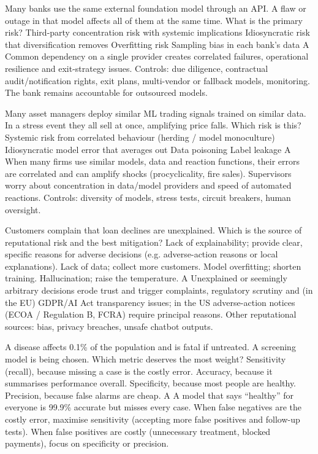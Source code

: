 {Many banks use the same external foundation model through an API. A flaw or outage in that model affects all of them at the same time. What is the primary risk?}
{Third-party concentration risk with systemic implications}
{Idiosyncratic risk that diversification removes}
{Overfitting risk}
{Sampling bias in each bank's data}
{A}
{Common dependency on a single provider creates correlated failures, operational resilience and exit-strategy issues. Controls: due diligence, contractual audit/notification rights, exit plans, multi-vendor or fallback models, monitoring. The bank remains accountable for outsourced models.}

{Many asset managers deploy similar ML trading signals trained on similar data. In a stress event they all sell at once, amplifying price falls. Which risk is this?}
{Systemic risk from correlated behaviour (herding / model monoculture)}
{Idiosyncratic model error that averages out}
{Data poisoning}
{Label leakage}
{A}
{When many firms use similar models, data and reaction functions, their errors are correlated and can amplify shocks (procyclicality, fire sales). Supervisors worry about concentration in data/model providers and speed of automated reactions. Controls: diversity of models, stress tests, circuit breakers, human oversight.}

{Customers complain that loan declines are unexplained. Which is the source of reputational risk and the best mitigation?}
{Lack of explainability; provide clear, specific reasons for adverse decisions (e.g. adverse-action reasons or local explanations).}
{Lack of data; collect more customers.}
{Model overfitting; shorten training.}
{Hallucination; raise the temperature.}
{A}
{Unexplained or seemingly arbitrary decisions erode trust and trigger complaints, regulatory scrutiny and (in the EU) GDPR/AI Act transparency issues; in the US adverse-action notices (ECOA / Regulation B, FCRA) require principal reasons. Other reputational sources: bias, privacy breaches, unsafe chatbot outputs.}

{A disease affects 0.1\% of the population and is fatal if untreated. A screening model is being chosen. Which metric deserves the most weight?}
{Sensitivity (recall), because missing a case is the costly error.}
{Accuracy, because it summarises performance overall.}
{Specificity, because most people are healthy.}
{Precision, because false alarms are cheap.}
{A}
{A model that says ``healthy'' for everyone is 99.9\% accurate but misses every case. When false negatives are the costly error, maximise sensitivity (accepting more false positives and follow-up tests). When false positives are costly (unnecessary treatment, blocked payments), focus on specificity or precision.}

